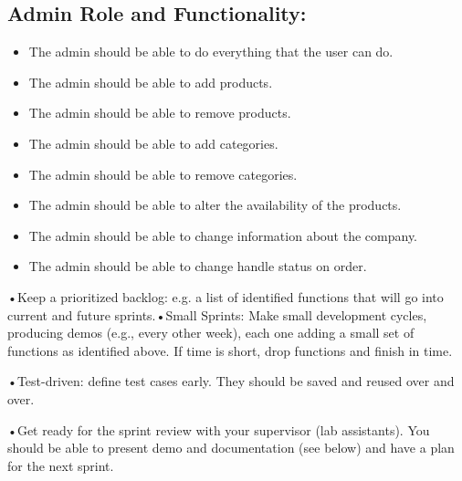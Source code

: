 \subsection{Admin Role and Functionality:}

\begin{itemize}
    \item The admin should be able to do everything that the user can do.
    \item The admin should be able to add products.
    \item The admin should be able to remove products. 
    \item The admin should be able to add categories. 
    \item The admin should be able to remove categories. 
    \item The admin should be able to alter the availability of the products. 
    \item The admin should be able to change information about the company.
    \item The admin should be able to change handle status on order.
\end{itemize}





•Keep a prioritized backlog: e.g. a list of identified functions that will go into current and future sprints.•Small Sprints: Make small development cycles, producing demos (e.g., every other week), each one adding a small set of functions as identified above. If time is short, drop functions and finish in time.

•Test-driven: define test cases early. They should be saved and reused over and over.

•Get ready for the sprint review with your supervisor (lab assistants). You should be able to present demo and documentation (see below) and have a plan for the next sprint.